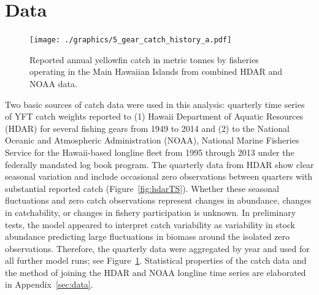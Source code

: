 \documentclass[12pt,letterpaper,twoside]{article}
\newcommand\help[1]{\color{Magenta}{\it #1 }\normalcolor}
\begin{document}
\section{Data}
\begin{figure}
\begin{center}
\texttt{[image: ./graphics/5\_gear\_catch\_history\_a.pdf]}
\caption{\label{fig:annualTS}
Reported annual yellowfin catch in metric tonnes by fisheries
operating in the Main Hawaiian Islands from combined HDAR and NOAA data.
}
\end{center}
\end{figure}

Two basic sources of catch data were used in this analysis:
quarterly time series of YFT catch weights reported to (1)
Hawaii Department of Aquatic Resources (HDAR) for several fishing
gears from 1949 to 2014 and (2)
to the National Oceanic and Atmospheric Administration (NOAA), National
Marine Fisheries Service for the Hawaii-based longline fleet
from 1995 through 2013 under the federally mandated log book program.  
The quarterly data from HDAR show clear seasonal variation and include
occasional zero observations between quarters with substantial
reported catch (Figure~\ref{fig:hdarTS}).
Whether these seasonal fluctuations and zero
catch observations represent changes in abundance, changes in
catchability, or changes in
fishery participation is unknown. In preliminary tests, the model appeared to
interpret catch variability as variability in stock abundance
predicting large fluctuations in biomass around the isolated zero
observations. Therefore, the quarterly data were aggregated by year
and used for all further model runs; see Figure~\ref{fig:annualTS}.
Statistical properties of the catch data and the method of joining the
HDAR and NOAA longline time series are elaborated in
Appendix~\ref{sec:data}. 

\help{More background and discussion of data deficiencies is needed
here, e. g.  the ``ahi'' problem, HDAR reporting requirements, changes
in the database, and ``recreational'' data.}
\end{document}
